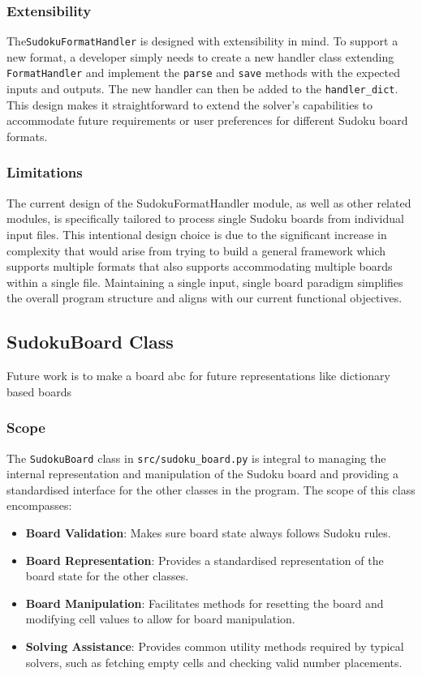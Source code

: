 \documentclass[11pt]{article}
\begin{document}
\begin{itemize}
\subsubsection{Extensibility}
The\texttt{SudokuFormatHandler} is designed with extensibility in mind. To support a new format, a developer simply needs to create a new handler class extending \texttt{FormatHandler} and implement the \texttt{parse} and \texttt{save} methods with the expected inputs and outputs. The new handler can then be added to the \texttt{handler\_dict}. This design makes it straightforward to extend the solver's capabilities to accommodate future requirements or user preferences for different Sudoku board formats.


\subsubsection{Limitations}
The current design of the SudokuFormatHandler module, as well as other related modules, is specifically tailored to process single Sudoku boards from individual input files. This intentional design choice is due to the significant increase in complexity that would arise from trying to build a general framework which supports multiple formats that also supports accommodating multiple boards within a single file. Maintaining a single input, single board paradigm simplifies the overall program structure and aligns with our current functional objectives. 


\subsection{SudokuBoard Class}
Future work is to make a board abc for future representations like dictionary based boards

\subsubsection{Scope}
The \texttt{SudokuBoard} class in \texttt{src/sudoku\_board.py} is integral to managing the internal representation and manipulation of the Sudoku board and providing a standardised interface for the other classes in the program. The scope of this class encompasses:

\begin{itemize}
    \item \textbf{Board Validation}: Makes sure board state always follows Sudoku rules. 
    \item \textbf{Board Representation}: Provides a standardised representation of the board state for the other classes. 
    \item \textbf{Board Manipulation}: Facilitates methods for resetting the board and modifying cell values to allow for board manipulation.
    \item \textbf{Solving Assistance}: Provides common utility methods required by typical solvers, such as fetching empty cells and checking valid number placements.


\end{itemize}
\end{itemize}
\end{document}
